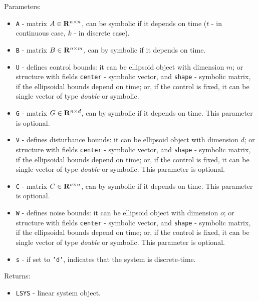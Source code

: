 \documentclass{report}
\begin{document}
Parameters:
\begin{itemize}
\item {\tt A} - matrix $A\in{\bf R}^{n\times n}$, can be symbolic if it
depends on time ($t$ - in continuous case, $k$ - in discrete case).
\item {\tt B} - matrix $B\in{\bf R}^{n\times m}$, can by symbolic if it
depends on time.
\item {\tt U} - defines control bounds: it can be ellipsoid object with
dimension $m$; or structure with fields {\tt center} - symbolic vector,
and {\tt shape} - symbolic matrix, if the ellipsoidal bounds depend on time;
or, if the control is fixed, it can be single vector of type {\it double}
or symbolic.
\item {\tt G} - matrix $G\in{\bf R}^{n\times d}$, can by symbolic if it
depends on time. This parameter is optional.
\item {\tt V} - defines disturbance bounds: it can be ellipsoid object with
dimension $d$; or structure with fields {\tt center} - symbolic vector,
and {\tt shape} - symbolic matrix, if the ellipsoidal bounds depend on time;
or, if the control is fixed, it can be single vector of type {\it double}
or symbolic. This parameter is optional.
\item {\tt C} - matrix $C\in{\bf R}^{o\times n}$, can by symbolic if it
depends on time. This parameter is optional.
\item {\tt W} - defines noise bounds: it can be ellipsoid object with
dimension $o$; or structure with fields {\tt center} - symbolic vector,
and {\tt shape} - symbolic matrix, if the ellipsoidal bounds depend on time;
or, if the control is fixed, it can be single vector of type {\it double}
or symbolic. This parameter is optional.
\item {\tt s} - if set to {\tt 'd'}, indicates that the system is discrete-time.
\end{itemize}

Returns:
\begin{itemize}
\item {\tt LSYS} - linear system object.
\end{itemize}

\end{document}
